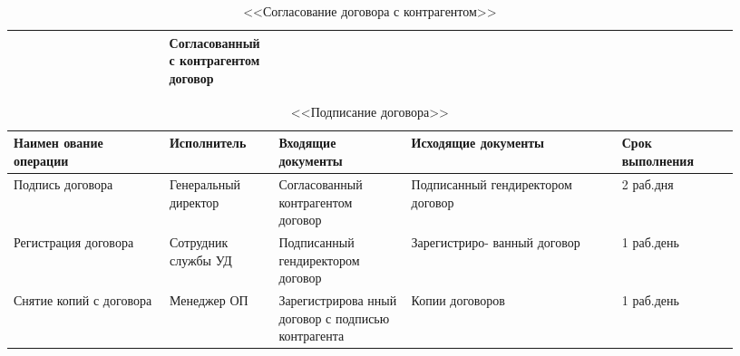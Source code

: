 \documentclass[a4paper,14pt]{extarticle}
\begin{document}
\begin{landscape}
\begin{table}[htbp]
\begin{center}
\begin{tabular}{|p{0.2\linewidth}|p{0.14\linewidth}|p{0.17\linewidth}|p{0.27\linewidth}|p{0.15\linewidth}|}
			& Согласованный с
			контрагентом
			договор
			
			& 
			\\ \hline
		\end{tabular}
	\end{center}
	\caption{ <<Согласование договора с контрагентом>>}
	\label{}
\end{table}
\newpage
{}

\begin{table}[htbp]
	\small
	\begin{center}
		\begin{tabular}{|p{0.2\linewidth}|p{0.14\linewidth}|p{0.17\linewidth}|p{0.27\linewidth}|p{0.15\linewidth}|}
			\hline
			\textbf{Наимен	ование операции} & \textbf{Исполнитель} & \textbf{Входящие документы} & \textbf{Исходящие документы} & \textbf{Срок выполнения} \\ \hline
			Подпись договора
			
			& Генеральный
			директор
			 & Согласованный
			 контрагентом
			 договор
			 
			
			& Подписанный
			гендиректором договор
			
			
			& 2
			раб.дня
			\\ \hline
			Регистрация
			договора
			
			
			& Сотрудник
			службы УД
			
			
			& Подписанный
			гендиректором
			договор
			
			
			& Зарегистриро- ванный
			договор
			
			
			& 1
			раб.день
			
			
			\\ \hline
			Снятие копий с
			договора
			
			
			
			& Менеджер ОП
			
			
			& Зарегистрирова
			нный договор с
			подписью
			контрагента
			
			
			
			& Копии договоров
			
			
			
			& 1
			раб.день
			
			\\ \hline
		\end{tabular}
	\end{center}
	\caption{<<Подписание договора>>}
	\label{}
\end{table}
	
\end{landscape}
\end{document}

